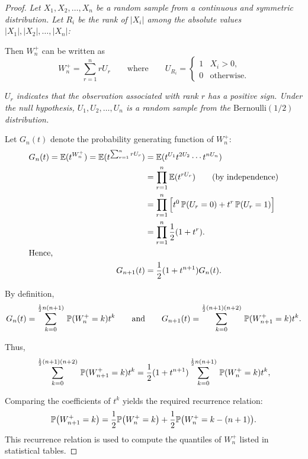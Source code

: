 \begin{proof}
\bit
\it Let $X_1,X_2,\ldots,X_n$ be a random sample from a continuous and symmetric distribution.
\it Let $R_i$ be the rank of $|X_i|$ among the absolute values $|X_1|,|X_2|,\ldots,|X_n|$:
\eit

Then $W^{+}_n$ can be written as
\[
W^{+}_n = \sum_{r=1}^n rU_r \qquad\text{where}\qquad U_{R_i} = \begin{cases} 1 & X_i > 0, \\ 0 & \text{otherwise.}\end{cases}
\]

\bit
\it $U_r$ indicates that the observation associated with rank $r$ has a positive sign.
\it Under the null hypothesis, $U_1,U_2,\ldots,U_n$ is a random sample from the $\text{Bernoulli}(1/2)$ distribution.
\eit

Let $G_n(t)$ denote the probability generating function of $W^{+}_n$:
\begin{align*}
G_n(t) 
	= \mathbb{E}(t^{W^{+}_n})  
	= \mathbb{E}(t^{\sum_{r=1}^n rU_r})
	& = \mathbb{E}(t^{U_1}t^{2U_2}\cdots t^{nU_n}) \\
	& = \prod_{r=1}^n \mathbb{E}(t^{rU_r}) \qquad\text{(by independence)} \\
	& = \prod_{r=1}^n \Big[t^0\,\mathbb{P}(U_r=0) + t^r\,\mathbb{P}(U_r=1)\Big] \\
	& = \prod_{r=1}^n \frac{1}{2}(1 + t^r). \\
\intertext{Hence,}
G_{n+1}(t) 
	& = \frac{1}{2}(1 + t^{n+1})G_n(t).
\end{align*}

By definition,
\begin{align*}
G_n(t)		= \sum_{k=0}^{\frac{1}{2}n(n+1)}\,\mathbb{P}(W^{+}_n=k)t^k
\qquad\text{and}\qquad
G_{n+1}(t)	= \sum_{k=0}^{\frac{1}{2}(n+1)(n+2)}\,\mathbb{P}(W^{+}_{n+1}=k)t^k.
\end{align*}

Thus,
\[
\sum_{k=0}^{\frac{1}{2}(n+1)(n+2)}\,\mathbb{P}(W^{+}_{n+1}=k)t^k 
	= \frac{1}{2}(1+t^{n+1})\sum_{k=0}^{\frac{1}{2}n(n+1)}\,\mathbb{P}(W^{+}_n=k)t^k,
\]

Comparing the coefficients of $t^k$ yields the required recurrence relation:
\[
\mathbb{P}\big(W^{+}_{n+1}=k\big) = \frac{1}{2}\mathbb{P}\big(W^{+}_n=k\big) + \frac{1}{2}\mathbb{P}\big(W^{+}_n=k-(n+1)\big).
\]
This recurrence relation is used to compute the quantiles of $W^{+}_n$ listed in statistical tables.
\end{proof}



